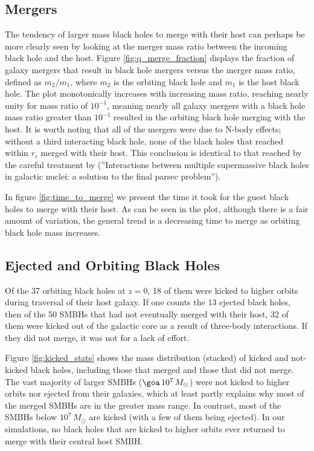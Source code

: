 \documentclass[fleqn,usenatbib,useAMS]{mnras}
\begin{document}
\subsection{Mergers}\label{sec:mergers}
The tendency of larger mass black holes to merge with their host can perhaps be more clearly seen by looking at the merger mass ratio between the incoming black hole and the host.  Figure \ref{fig:q_merge_fraction} displays the fraction of galaxy mergers that result in black hole mergers versus the merger mass ratio, defined as $m_2/m_1$, where $m_2$ is the orbiting black hole and $m_1$ is the host black hole.  The plot monotonically increases with increasing mass ratio, reaching nearly unity for mass ratio of $10^{-1}$, meaning nearly all galaxy mergers with a black hole mass ratio greater than $10^{-1}$ resulted in the orbiting black hole merging with the host.  It is worth noting that all of the mergers were due to N-body effects; without a third interacting black hole, none of the black holes that reached within $r{_c}$ merged with their host.  This conclusion is identical to that reached by the careful treatment by \citet{2018MNRAS.473.3410R} (''Interactions between multiple supermassive black holes in galactic nuclei: a solution to the final parsec problem'').

In figure \ref{fig:time_to_merge} we present the time it took for the guest black holes to merge with their host.  As can be seen in the plot, although there is a fair amount of variation, the general trend is a decreasing time to merge as orbiting black hole mass increases.

\subsection{Ejected and Orbiting Black Holes}\label{sec:kicked_orbiting}
Of the 37 orbiting black holes at $z=0$, 18 of them were kicked to higher orbits during traversal of their host galaxy.  If one counts the 13 ejected black holes, then of the 50 SMBHs that had not eventually merged with their host, 32 of them were kicked out of the galactic core as a result of three-body interactions.  If they did not merge, it was not for a lack of effort.

Figure \ref{fig:kicked_stats} shows the mass distribution (stacked) of kicked and not-kicked black holes, including those that merged and those that did not merge.  The vast majority of larger SMBHs ($\goa\, 10^7\, M_{\odot}$) were not kicked to higher orbits nor ejected from their galaxies, which at least partly explains why most of the merged SMBHs are in the greater mass range.  In contrast, most of the SMBHs below $10^7\, M_{\odot}$ are kicked (with a few of them being ejected).  In our simulations, no black holes that are kicked to higher orbits ever returned to merge with their central host SMBH.
\end{document}
